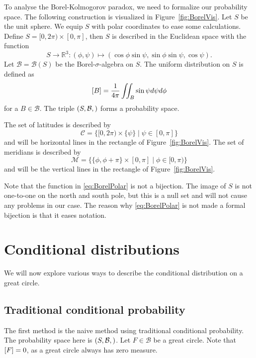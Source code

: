 \documentclass[a4paper]{report}
\theoremstyle{plain}
\theoremstyle{definition}
\theoremstyle{remark}
\numberwithin{equation}{chapter}
\newcommand{\R}{\mathbb{R}}
\let\P\relax
\DeclareMathOperator{\P}{\mathbb{P}}
\DeclareMathOperator{\1}{\mathbbm{1}}
\newcommand{\B}{\mathcal{B}}
\begin{document}
To analyse the Borel-Kolmogorov paradox, we need to formalize our probability space. The following construction is visualized in Figure~\ref{fig:BorelVis}. Let $S$ be the unit sphere. We equip $S$ with polar coordinates to ease some calculations. Define $S=[0,2\pi)\times[0,\pi]$, then $S$ is described in the Euclidean space with the function
\begin{equation}\label{eq:BorelPolar}
S\to\R^3:(\phi,\psi)\mapsto(\cos\phi\sin\psi,\sin\phi\sin\psi,\cos\psi).
\end{equation}
Let $\B=\B(S)$ be the Borel-$\sigma$-algebra on $S$. The uniform distribution on $S$ is defined as
\begin{equation}
\P[B]=\frac{1}{4\pi}\iint_B\sin\psi d\psi d\phi
\end{equation}
for a $B\in\B$. The triple $(S,\B,\P)$ forms a probability space.

The set of latitudes is described by
\begin{equation}
\mathcal{C}=\{[0,2\pi)\times\{\psi\}\mid\psi\in[0,\pi]\}
\end{equation}
and will be horizontal lines in the rectangle of Figure~\ref{fig:BorelVis}. The set of meridians is described by
\begin{equation}
\mathcal{M}=\{\{\phi,\phi+\pi\}\times[0,\pi]\mid\phi\in[0,\pi)\}
\end{equation}
and will be the vertical lines in the rectangle of Figure~\ref{fig:BorelVis}.

Note that the function in \eqref{eq:BorelPolar} is not a bijection. The image of $S$ is not one-to-one on the north and south pole, but this is a null set and will not cause any problems in our case. The reason why \eqref{eq:BorelPolar} is not made a formal bijection is that it eases notation.

\section{Conditional distributions}
We will now explore various ways to describe the conditional distribution on a great circle.
\subsection{Traditional conditional probability}\label{sec:BorelNaive}
The first method is the naive method using traditional conditional probability. The probability space here is $(S,\B,\P)$. Let $F\in\B$ be a great circle. Note that $\P[F]=0$, as a great circle always has zero measure.
\end{document}
